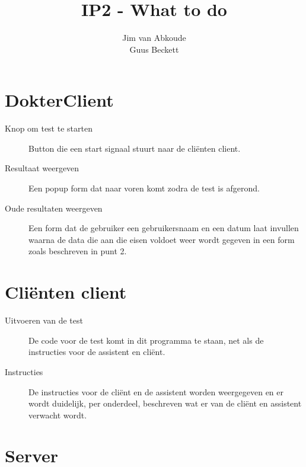 \documentclass[10pt,a4paper,draft]{article}
\author{Jim van Abkoude \\ Guus Beckett}
\title{IP2 - What to do}
\begin{document}
\maketitle
\newpage
\section{DokterClient}

\begin{description}
\item[Knop om test te starten] Button die een start signaal stuurt naar de cli\"enten client.
\item[Resultaat weergeven] Een popup form dat naar voren komt zodra de test is afgerond.
\item[Oude resultaten weergeven] Een form dat de gebruiker een gebruikersnaam en een datum laat invullen waarna de data die aan die eisen voldoet weer wordt gegeven in een form zoals beschreven in punt 2.
\end{description}
\newpage
\section{Cli\"enten client}
\begin{description}
\item[Uitvoeren van de test] De code voor de test komt in dit programma te staan, net als de instructies voor de assistent en cli\"ent.
\item[Instructies] De instructies voor de cli\"ent en de assistent worden weergegeven en er wordt duidelijk, per onderdeel, beschreven wat er van de cli\"ent en assistent verwacht wordt.
\end{description}
\newpage
\section{Server}
\newpage
\end{document}
